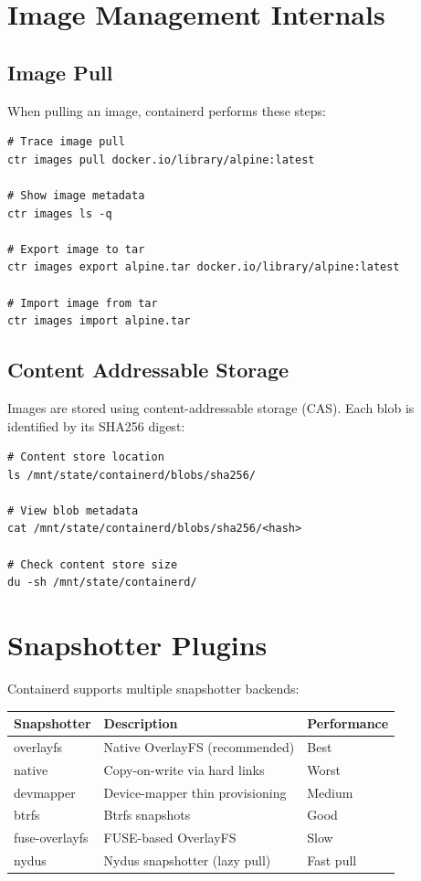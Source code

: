 \section{Image Management Internals}

\subsection{Image Pull}

When pulling an image, containerd performs these steps:

\begin{lstlisting}
# Trace image pull
ctr images pull docker.io/library/alpine:latest

# Show image metadata
ctr images ls -q

# Export image to tar
ctr images export alpine.tar docker.io/library/alpine:latest

# Import image from tar
ctr images import alpine.tar
\end{lstlisting}

\subsection{Content Addressable Storage}

Images are stored using content-addressable storage (CAS). Each blob
is identified by its SHA256 digest:

\begin{lstlisting}
# Content store location
ls /mnt/state/containerd/blobs/sha256/

# View blob metadata
cat /mnt/state/containerd/blobs/sha256/<hash>

# Check content store size
du -sh /mnt/state/containerd/
\end{lstlisting}

\section{Snapshotter Plugins}

Containerd supports multiple snapshotter backends:

\begin{longtable}{|p{3.5cm}|p{4cm}|p{4cm}|}
\hline
\textbf{Snapshotter} & \textbf{Description} & \textbf{Performance} \\
\hline
overlayfs & Native OverlayFS (recommended) & Best \\
native & Copy-on-write via hard links & Worst \\
devmapper & Device-mapper thin provisioning & Medium \\
btrfs & Btrfs snapshots & Good \\
fuse-overlayfs & FUSE-based OverlayFS & Slow \\
nydus & Nydus snapshotter (lazy pull) & Fast pull \\
\hline
\end{longtable}

